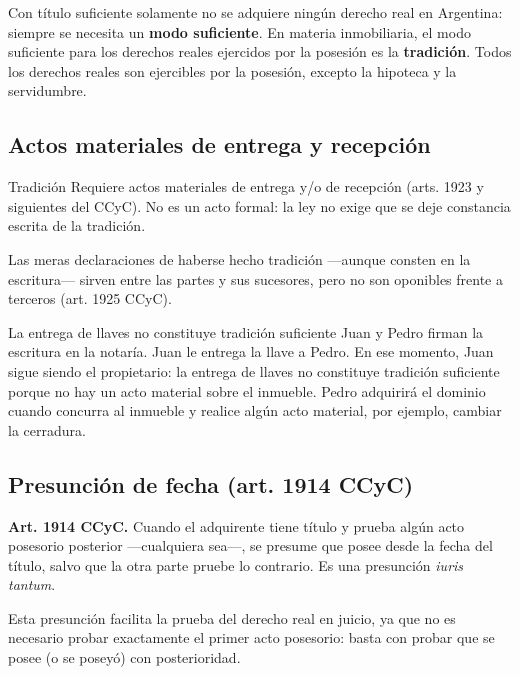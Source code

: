 \documentclass[12pt,oneside]{book}
\begin{document}
Con título suficiente solamente no se adquiere ningún derecho real en Argentina: siempre se necesita un \textbf{modo suficiente}. En materia inmobiliaria, el modo suficiente para los derechos reales ejercidos por la posesión es la \textbf{tradición}. Todos los derechos reales son ejercibles por la posesión, excepto la hipoteca y la servidumbre.

\subsection{Actos materiales de entrega y recepción}

\begin{definition}{Tradición}
Requiere actos materiales de entrega y/o de recepción (arts. 1923 y siguientes del CCyC). No es un acto formal: la ley no exige que se deje constancia escrita de la tradición.
\end{definition}

\begin{important}
Las meras declaraciones de haberse hecho tradición —aunque consten en la escritura— sirven entre las partes y sus sucesores, pero no son oponibles frente a terceros (art. 1925 CCyC).
\end{important}

\begin{example}{La entrega de llaves no constituye tradición suficiente}
Juan y Pedro firman la escritura en la notaría. Juan le entrega la llave a Pedro. En ese momento, Juan sigue siendo el propietario: la entrega de llaves no constituye tradición suficiente porque no hay un acto material sobre el inmueble. Pedro adquirirá el dominio cuando concurra al inmueble y realice algún acto material, por ejemplo, cambiar la cerradura.
\end{example}

\subsection{Presunción de fecha (art. 1914 CCyC)}

\begin{note}
\textbf{Art. 1914 CCyC.} Cuando el adquirente tiene título y prueba algún acto posesorio posterior —cualquiera sea—, se presume que posee desde la fecha del título, salvo que la otra parte pruebe lo contrario. Es una presunción \textit{iuris tantum}.
\end{note}

Esta presunción facilita la prueba del derecho real en juicio, ya que no es necesario probar exactamente el primer acto posesorio: basta con probar que se posee (o se poseyó) con posterioridad.
\end{document}
